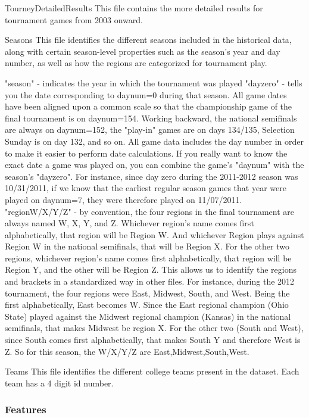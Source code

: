 \documentclass{article} %
\begin{document}
TourneyDetailedResults
This file contains the more detailed results for tournament games from 2003 onward.

Seasons
This file identifies the different seasons included in the historical data, along with certain season-level properties such as the season's year and day number, as well as how the regions are categorized for tournament play.

"season" - indicates the year in which the tournament was played
"dayzero" - tells you the date corresponding to daynum=0 during that season. All game dates have been aligned upon a common scale so that the championship game of the final tournament is on daynum=154. Working backward, the national semifinals are always on daynum=152, the "play-in" games are on days 134/135, Selection Sunday is on day 132, and so on. All game data includes the day number in order to make it easier to perform date calculations. If you really want to know the exact date a game was played on, you can combine the game's "daynum" with the season's "dayzero". For instance, since day zero during the 2011-2012 season was 10/31/2011, if we know that the earliest regular season games that year were played on daynum=7, they were therefore played on 11/07/2011.
"regionW/X/Y/Z" - by convention, the four regions in the final tournament are always named W, X, Y, and Z. Whichever region's name comes first alphabetically, that region will be Region W. And whichever Region plays against Region W in the national semifinals, that will be Region X. For the other two regions, whichever region's name comes first alphabetically, that region will be Region Y, and the other will be Region Z. This allows us to identify the regions and brackets in a standardized way in other files. For instance, during the 2012 tournament, the four regions were East, Midwest, South, and West. Being the first alphabetically, East becomes W. Since the East regional champion (Ohio State) played against the Midwest regional champion (Kansas) in the national semifinals, that makes Midwest be region X. For the other two (South and West), since South comes first alphabetically, that makes South Y and therefore West is Z. So for this season, the W/X/Y/Z are East,Midwest,South,West.


Teams
This file identifies the different college teams present in the dataset. Each team has a 4 digit id number.


\subsubsection{Features}
\label{sec:data-winner-features}
\end{document}
